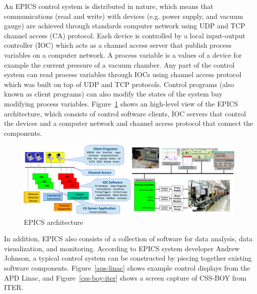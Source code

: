 An EPICS control system is distributed in nature, which means that communications (read and write) with devices (e.g. power supply, and vacuum gauge) are achieved through standards computer network using UDP and TCP channel access (CA) protocol. Each device is controlled by a local input-output controller (IOC) which acts as a channel access server that publish process variables on a computer network. A process variable is a values of a device for example the current pressure of a vacuum chamber. Any part of the control system can read process variables through IOCs using channel access protocol which was built on top of UDP and TCP protocols. Control programs (also known as client programs) can also modify the states of the system buy modifying process variables. Figure~\ref{epics-arch} shows an high-level view of the EPICS architecture, which consists of control software clients, IOC servers that control the devices and a computer network and channel access protocol that connect the components.

\begin{figure}[h!]
\begin{center}
\includegraphics[width=6.5in]{figures/epics-arch.png}
\caption{EPICS architecture \label{epics-arch}}
\end{center}
\end{figure}

In addition, EPICS also consists of a collection of software for data analysis, data visualization, and monitoring. According to EPICS system developer Andrew Johnson, a typical control system can be constructed by piecing together existing software components\cite{lecture:johnson_intro_to_epics}. Figure~\ref{aps-linac} shows example control displays from the APD Linac, and Figure~\ref{css-boy-iter} shows a screen capture of CSS-BOY from ITER.


